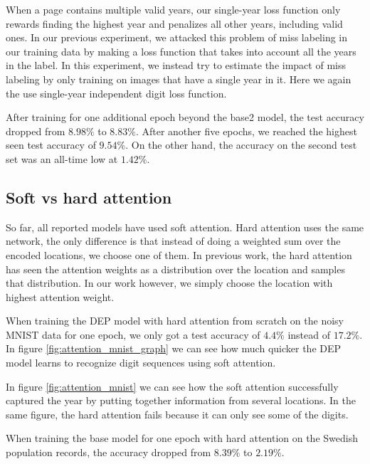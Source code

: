 When a page contains multiple valid years, our single-year loss function only rewards finding the highest year and penalizes all other years, including valid ones.
In our previous experiment, we attacked this problem of miss labeling in our training data by making a loss function that takes into account all the years in the label. In this experiment, we instead try to estimate the impact of miss labeling by only training on images that have a single year in it. Here we again the use single-year independent digit loss function.

After training for one additional epoch beyond the base2 model, the test accuracy dropped from $8.98\%$ to $8.83\%$.
After another five epochs, we reached the highest seen test accuracy of $9.54\%$. On the other hand, the accuracy on the second test set was an all-time low at $1.42\%$.

\subsection{Soft vs hard attention} \label{sssec:result_attention}

So far, all reported models have used soft attention. Hard attention uses the same network, the only difference is that instead of doing a weighted sum over the encoded locations, we choose one of them. In previous work, the hard attention has seen the attention weights as a distribution over the location and samples that distribution. In our work however, we simply choose the location with highest attention weight.



When training the DEP model with hard attention from scratch on the noisy MNIST data for one epoch, we only got a test accuracy of $4.4\%$ instead of $17.2\%$.
In figure \ref{fig:attention_mnist_graph} we can see how much quicker the DEP model learns to recognize digit sequences using soft attention.



In figure \ref{fig:attention_mnist} we can see how the soft attention successfully captured the year by putting together information from several locations. In the same figure, the hard attention fails because it can only see some of the digits.

When training the base model for one epoch with hard attention on the Swedish population records, the accuracy dropped from $8.39\%$ to $2.19\%$.

